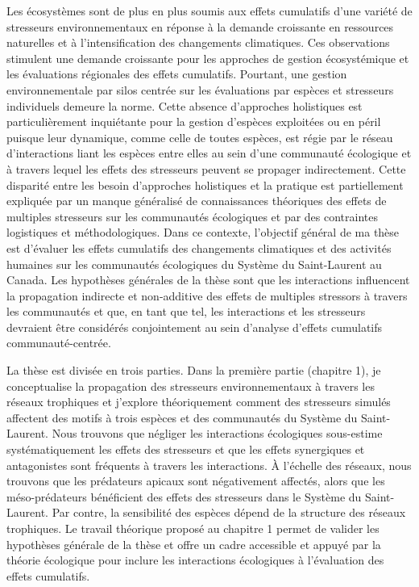 Les écosystèmes sont de plus en plus soumis aux effets cumulatifs d'une
variété de stresseurs environnementaux en réponse à la demande
croissante en ressources naturelles et à l'intensification des
changements climatiques. Ces observations stimulent une demande
croissante pour les approches de gestion écosystémique et les
évaluations régionales des effets cumulatifs. Pourtant, une gestion
environnementale par silos centrée sur les évaluations par espèces et
stresseurs individuels demeure la norme. Cette absence d'approches
holistiques est particulièrement inquiétante pour la gestion d'espèces
exploitées ou en péril puisque leur dynamique, comme celle de toutes
espèces, est régie par le réseau d'interactions liant les espèces entre
elles au sein d'une communauté écologique et à travers lequel les effets
des stresseurs peuvent se propager indirectement. Cette disparité entre
les besoin d'approches holistiques et la pratique est partiellement
expliquée par un manque généralisé de connaissances théoriques des
effets de multiples stresseurs sur les communautés écologiques et par
des contraintes logistiques et méthodologiques. Dans ce contexte,
l'objectif général de ma thèse est d'évaluer les effets cumulatifs des
changements climatiques et des activités humaines sur les communautés
écologiques du Système du Saint-Laurent au Canada. Les hypothèses
générales de la thèse sont que les interactions influencent la
propagation indirecte et non-additive des effets de multiples stressors
à travers les communautés et que, en tant que tel, les interactions et
les stresseurs devraient être considérés conjointement au sein d'analyse
d'effets cumulatifs communauté-centrée.

La thèse est divisée en trois parties. Dans la première partie (chapitre
1), je conceptualise la propagation des stresseurs environnementaux à
travers les réseaux trophiques et j'explore théoriquement comment des
stresseurs simulés affectent des motifs à trois espèces et des
communautés du Système du Saint-Laurent. Nous trouvons que négliger les
interactions écologiques sous-estime systématiquement les effets des
stresseurs et que les effets synergiques et antagonistes sont fréquents
à travers les interactions. À l'échelle des réseaux, nous trouvons que
les prédateurs apicaux sont négativement affectés, alors que les
méso-prédateurs bénéficient des effets des stresseurs dans le Système du
Saint-Laurent. Par contre, la sensibilité des espèces dépend de la
structure des réseaux trophiques. Le travail théorique proposé au
chapitre 1 permet de valider les hypothèses générale de la thèse et
offre un cadre accessible et appuyé par la théorie écologique pour
inclure les interactions écologiques à l'évaluation des effets
cumulatifs.

